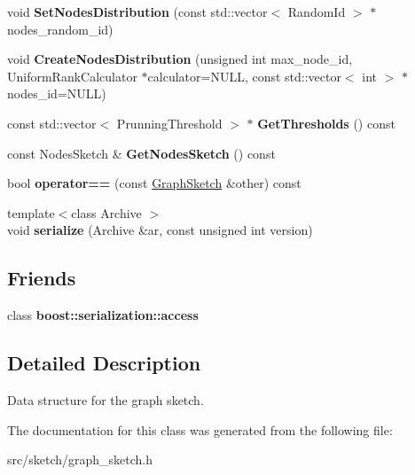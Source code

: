 \begin{DoxyCompactItemize}
\item 
\hypertarget{classall__distance__sketch_1_1GraphSketch_af57117f7a70b714dedc882d8f213207c}{}void {\bfseries Set\+Nodes\+Distribution} (const std\+::vector$<$ Random\+Id $>$ $\ast$nodes\+\_\+random\+\_\+id)\label{classall__distance__sketch_1_1GraphSketch_af57117f7a70b714dedc882d8f213207c}

\item 
\hypertarget{classall__distance__sketch_1_1GraphSketch_aab18dbc5e7923b7bfe036777c9862ddb}{}void {\bfseries Create\+Nodes\+Distribution} (unsigned int max\+\_\+node\+\_\+id, Uniform\+Rank\+Calculator $\ast$calculator=N\+U\+L\+L, const std\+::vector$<$ int $>$ $\ast$nodes\+\_\+id=N\+U\+L\+L)\label{classall__distance__sketch_1_1GraphSketch_aab18dbc5e7923b7bfe036777c9862ddb}

\item 
\hypertarget{classall__distance__sketch_1_1GraphSketch_aff8e85b1427635ff20b1035469a50b33}{}const std\+::vector$<$ Prunning\+Threshold $>$ $\ast$ {\bfseries Get\+Thresholds} () const \label{classall__distance__sketch_1_1GraphSketch_aff8e85b1427635ff20b1035469a50b33}

\item 
\hypertarget{classall__distance__sketch_1_1GraphSketch_a818165eb0002ab99756bc71cb740e222}{}const Nodes\+Sketch \& {\bfseries Get\+Nodes\+Sketch} () const \label{classall__distance__sketch_1_1GraphSketch_a818165eb0002ab99756bc71cb740e222}

\item 
\hypertarget{classall__distance__sketch_1_1GraphSketch_a11f287817797d4433d148843e8c7fbb9}{}bool {\bfseries operator==} (const \hyperlink{classall__distance__sketch_1_1GraphSketch}{Graph\+Sketch} \&other) const \label{classall__distance__sketch_1_1GraphSketch_a11f287817797d4433d148843e8c7fbb9}

\item 
\hypertarget{classall__distance__sketch_1_1GraphSketch_ad62599e5e41b2aaf7a8a7c2e1e5c3617}{}{\footnotesize template$<$class Archive $>$ }\\void {\bfseries serialize} (Archive \&ar, const unsigned int version)\label{classall__distance__sketch_1_1GraphSketch_ad62599e5e41b2aaf7a8a7c2e1e5c3617}

\end{DoxyCompactItemize}
\subsection*{Friends}
\begin{DoxyCompactItemize}
\item 
\hypertarget{classall__distance__sketch_1_1GraphSketch_ac98d07dd8f7b70e16ccb9a01abf56b9c}{}class {\bfseries boost\+::serialization\+::access}\label{classall__distance__sketch_1_1GraphSketch_ac98d07dd8f7b70e16ccb9a01abf56b9c}

\end{DoxyCompactItemize}


\subsection{Detailed Description}
Data structure for the graph sketch. 

The documentation for this class was generated from the following file\+:\begin{DoxyCompactItemize}
\item 
src/sketch/graph\+\_\+sketch.\+h\end{DoxyCompactItemize}
